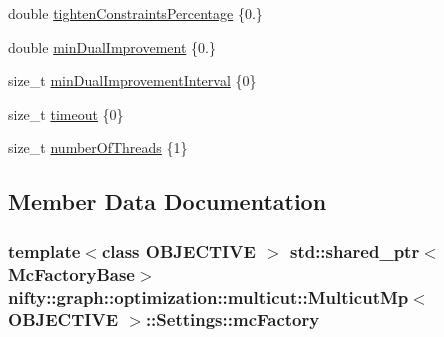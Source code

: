 \begin{DoxyCompactItemize}
double \hyperlink{structnifty_1_1graph_1_1optimization_1_1multicut_1_1MulticutMp_1_1Settings_aeb8287edaabc750951a1c99308aee48f}{tighten\+Constraints\+Percentage} \{0.\}
\item 
double \hyperlink{structnifty_1_1graph_1_1optimization_1_1multicut_1_1MulticutMp_1_1Settings_a2c8d8ef6f540f9b23461054b8a499536}{min\+Dual\+Improvement} \{0.\}
\item 
size\+\_\+t \hyperlink{structnifty_1_1graph_1_1optimization_1_1multicut_1_1MulticutMp_1_1Settings_a26d486b551cc166b5ce9f4b901fc8e37}{min\+Dual\+Improvement\+Interval} \{0\}
\item 
size\+\_\+t \hyperlink{structnifty_1_1graph_1_1optimization_1_1multicut_1_1MulticutMp_1_1Settings_a6361493238dff8b6e943b32e165ba8b7}{timeout} \{0\}
\item 
size\+\_\+t \hyperlink{structnifty_1_1graph_1_1optimization_1_1multicut_1_1MulticutMp_1_1Settings_a1943eefa945fb318bed49f83c3c96cd6}{number\+Of\+Threads} \{1\}
\end{DoxyCompactItemize}


\subsection{Member Data Documentation}
\hypertarget{structnifty_1_1graph_1_1optimization_1_1multicut_1_1MulticutMp_1_1Settings_a9490b9bbb3b5bf9dd5fee8dba91bf64e}{}
\subsubsection[{mc\+Factory}]{\setlength{\rightskip}{0pt plus 5cm}template$<$class O\+B\+J\+E\+C\+T\+I\+V\+E $>$ std\+::shared\+\_\+ptr$<${\bf Mc\+Factory\+Base}$>$ {\bf nifty\+::graph\+::optimization\+::multicut\+::\+Multicut\+Mp}$<$ O\+B\+J\+E\+C\+T\+I\+V\+E $>$\+::Settings\+::mc\+Factory}\label{structnifty_1_1graph_1_1optimization_1_1multicut_1_1MulticutMp_1_1Settings_a9490b9bbb3b5bf9dd5fee8dba91bf64e}
\hypertarget{structnifty_1_1graph_1_1optimization_1_1multicut_1_1MulticutMp_1_1Settings_a2c8d8ef6f540f9b23461054b8a499536}{}
